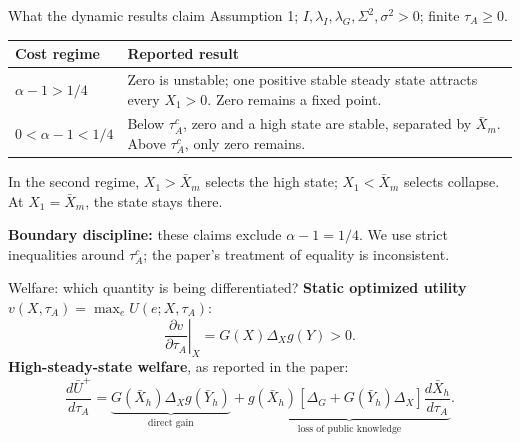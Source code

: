 \documentclass[11pt,aspectratio=169]{beamer}
\begin{document}
\begin{frame}{What the dynamic results claim}
\small
Assumption 1; $I,\lambda_I,\lambda_G,\Sigma^2,\sigma^2>0$; finite $\tau_A\geq0$.
\medskip

\begin{tabular}{@{}p{}p{}@{}}
\toprule
Cost regime & Reported result \\
\midrule
$\alpha-1>1/4$ & Zero is unstable; one positive stable steady state attracts every $X_1>0$. Zero remains a fixed point. \\[3mm]
$0<\alpha-1<1/4$ & Below $\tau_A^c$, zero and a high state are stable, separated by $\bar X_m$. Above $\tau_A^c$, only zero remains. \\
\bottomrule
\end{tabular}
\medskip

In the second regime, $X_1>\bar X_m$ selects the high state;
$X_1<\bar X_m$ selects collapse. At $X_1=\bar X_m$, the state stays there.
\medskip

\textbf{Boundary discipline:} these claims exclude $\alpha-1=1/4$.
We use strict inequalities around $\tau_A^c$; the paper's treatment of equality is inconsistent.
\end{frame}

\begin{frame}{Welfare: which quantity is being differentiated?}
\textbf{Static optimized utility} $v(X,\tau_A)=\max_e U(e;X,\tau_A)$:
\[
\left.\frac{\partial v}{\partial\tau_A}\right|_X=G(X)\Delta_Xg(Y)>0.
\]
\textbf{High-steady-state welfare}, as reported in the paper:
\[
\frac{d\bar U^+}{d\tau_A}
=\underbrace{G(\bar X_h)\Delta_Xg(\bar Y_h)}_{\text{direct gain}}
+\underbrace{g(\bar X_h)[\Delta_G+G(\bar Y_h)\Delta_X]
\frac{d\bar X_h}{d\tau_A}}_{\text{loss of public knowledge}}.
\]
\end{frame}
\end{document}
